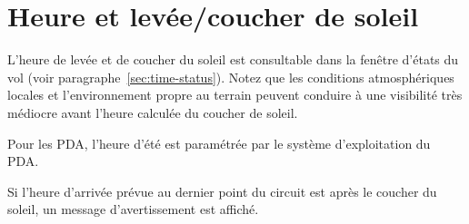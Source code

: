 \section{Heure et levée/coucher de soleil}

L'heure de levée et de coucher du soleil est consultable dans la fenêtre d'états du vol (voir paragraphe~\ref{sec:time-status}). Notez que les conditions atmosphériques locales et l'environnement propre au terrain peuvent conduire à une visibilité très médiocre avant l'heure calculée du coucher de soleil.

Pour les PDA, l'heure d'été est paramétrée par le système d'exploitation du PDA.\@

Si l'heure d'arrivée prévue au dernier point du circuit est après le coucher du soleil, un message d'avertissement est affiché.
